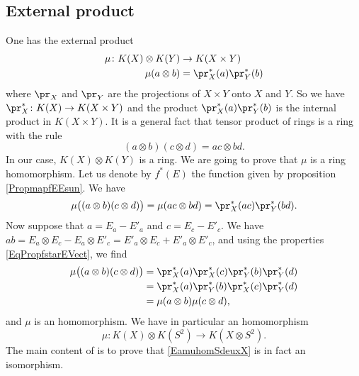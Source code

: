 					\subsection{External product}

One has the external product 
\begin{equation}
\begin{aligned}
 \mu\colon K(X)\otimes K(Y)&\to K(X\times Y) \\ 
   \mu(a\otimes b)&= \pr_X^*(a)\pr^*_Y(b) 
\end{aligned}
\end{equation}
where $\pr_X$ and $\pr_Y$ are the projections of $X\times Y$ onto $X$ and $Y$. So we have $\pr_X^*\colon K(X)\to K(X\times Y)$ and the product $\pr_X^*(a)\pr^*_Y(b) $ is the internal product in $K(X\times Y)$. It is a general fact that tensor product of rings is a ring with the rule
\begin{equation}
	(a\otimes b)(c\otimes d)=ac\otimes bd.
\end{equation}
In our case, $K(X)\otimes K(Y)$ is a ring. We are going to prove that $\mu$ is a ring homomorphism. Let us denote by $f^*(E)$ the function given by proposition \ref{PropmapfEEsun}. We have
\[ 
  \mu\big( (a\otimes b)(c\otimes d) \big)=\mu(ac\otimes bd)=\pr^*_X(ac)\pr^*_Y(bd).
\]
Now suppose that $a=E_a-E'_a$ and $c=E_c-E'_c$. We have $ab=E_a\otimes E_c-E_a\otimes E'_c=E'_a\otimes E_c+E'_a\otimes E'_c$, and using the properties \eqref{EqPropfstarEVect}, we find
\begin{align*}
 \mu\big( (a\otimes b)(c\otimes d) \big)	&=\pr^*_X(a)\pr^*_X(c)\pr^*_Y(b)\pr^*_Y(d)\\
						&=\pr^*_X(a)\pr^*_Y(b)\pr^*_X(c)\pr^*_Y(d)\\
						&=\mu(a\otimes b)\mu(c\otimes d),
\end{align*}
and $\mu$ is an homomorphism. We have in particular an homomorphism
\begin{equation}		\label{EamuhomSdeuxX}
  \mu\colon K(X)\otimes K(S^2)\to K(X\otimes S^2).
\end{equation}
The main content of  is to prove that \eqref{EamuhomSdeuxX} is in fact an isomorphism.


